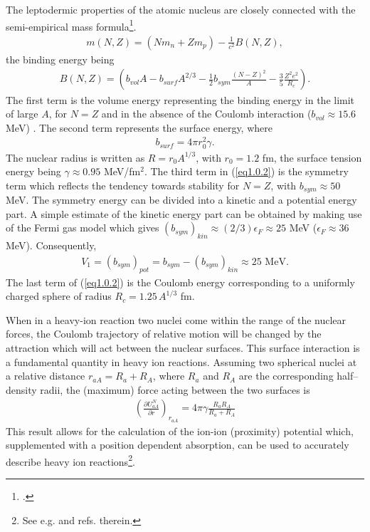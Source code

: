 The leptodermic properties of the atomic nucleus are closely connected with the semi-empirical mass formula\footnote{\cite{Weizsacker:35}.}.
\begin{align}
m(N,Z)=(Nm_n+Zm_p)-\frac{1}{c^2}B(N,Z),
\end{align}
the binding energy being
\begin{align}\label{eq1.0.2}
B(N,Z)=\left(b_{vol}A-b_{surf}A^{2/3}-\frac{1}{2} b_{sym}\frac{(N-Z)^2}{A}-\frac{3}{5}\frac{Z^2e^2}{R_c}\right).
\end{align}
The first term is the volume energy representing the binding energy in the limit of large $A$, for $N=Z$ and in the absence of the Coulomb interaction ($b_{vol}\approx15.6$ MeV) . The second term represents the surface energy, where
\begin{align}\label{eq1.0.3}
b_{surf}=4\pi r_0^2\gamma.
\end{align}
The nuclear radius is written as $R=r_0A^{1/3}$, with $r_0=1.2$ fm, the surface tension energy being $\gamma\approx 0.95$ MeV/fm$^2$. 
The third term in (\ref{eq1.0.2}) is the symmetry term which reflects the tendency towards stability for $N=Z$, with $b_{sym}\approx50$ MeV. The symmetry energy can be divided into a kinetic and a potential energy part. A simple estimate of the kinetic energy part can be obtained by making use of the Fermi gas model which gives $(b_{sym})_{kin}\approx(2/3)\epsilon_F\approx25$ MeV ($\epsilon_F\approx 36$ MeV). Consequently,
\begin{align}\label{eq1.0.4bis}
V_1=(b_{sym})_{pot}=b_{sym}-(b_{sym})_{kin}\approx 25\text{ MeV}.
\end{align}
The last term of (\ref{eq1.0.2}) is the Coulomb energy corresponding to a uniformly charged sphere of radius $R_c=1.25\,A^{1/3}$ fm.


When in a heavy-ion reaction  two nuclei come within the range of the nuclear forces, the Coulomb  trajectory of relative motion will be changed by the attraction which will act between the nuclear surfaces. This surface interaction is a fundamental quantity in  heavy ion reactions. Assuming two spherical nuclei at a relative distance $r_{aA}=R_a+R_A$, where $R_a$ and $R_A$ are the corresponding half--density radii, the (maximum) force acting between the two surfaces is
\begin{align}\label{eq1.0.4}
\left(\frac{\partial U_{aA}^N}{\partial r}\right)_{r_{aA}}=4\pi \gamma\frac{R_aR_A}{R_a+R_A}
\end{align}
This result allows for the calculation of the ion-ion (proximity) potential which, supplemented with a position dependent absorption, can be used to accurately describe heavy ion reactions\footnote{See e.g. \cite{Broglia:04a} and refs. therein.}.


